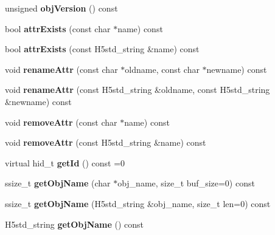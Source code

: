 \begin{DoxyCompactItemize}
\item 
\mbox{\label{class_h5_1_1_h5_object_aae0ac7d78a51f215d540f6ce5e5976a0}} 
unsigned {\bfseries obj\+Version} () const
\item 
\mbox{\label{class_h5_1_1_h5_object_a354b677eedb053dcdab090434d19e1bf}} 
bool {\bfseries attr\+Exists} (const char $\ast$name) const
\item 
\mbox{\label{class_h5_1_1_h5_object_a170d3028f081678db83132cc5434b00f}} 
bool {\bfseries attr\+Exists} (const H5std\+\_\+string \&name) const
\item 
\mbox{\label{class_h5_1_1_h5_object_a303a5fa51c03a7ed302fe88a7cd79eef}} 
void {\bfseries rename\+Attr} (const char $\ast$oldname, const char $\ast$newname) const
\item 
\mbox{\label{class_h5_1_1_h5_object_aa8e376bb5dc1c4c0e375db889b08b0e2}} 
void {\bfseries rename\+Attr} (const H5std\+\_\+string \&oldname, const H5std\+\_\+string \&newname) const
\item 
\mbox{\label{class_h5_1_1_h5_object_aad1cbcfb19f7993c981b7f2dfd8c7d2e}} 
void {\bfseries remove\+Attr} (const char $\ast$name) const
\item 
\mbox{\label{class_h5_1_1_h5_object_a17e15c351f218dc2413ee7a3e09ce877}} 
void {\bfseries remove\+Attr} (const H5std\+\_\+string \&name) const
\item 
\mbox{\label{class_h5_1_1_h5_object_a9fbbbd289647d76df6cdc74f48d39094}} 
virtual hid\+\_\+t {\bfseries get\+Id} () const =0
\item 
\mbox{\label{class_h5_1_1_h5_object_a70535cfa7cbdfff89238083b4a58ca33}} 
ssize\+\_\+t {\bfseries get\+Obj\+Name} (char $\ast$obj\+\_\+name, size\+\_\+t buf\+\_\+size=0) const
\item 
\mbox{\label{class_h5_1_1_h5_object_ad8b0a20e4c05f1cbf0123214333d8a8c}} 
ssize\+\_\+t {\bfseries get\+Obj\+Name} (H5std\+\_\+string \&obj\+\_\+name, size\+\_\+t len=0) const
\item 
\mbox{\label{class_h5_1_1_h5_object_af87e012949a2c19c58fed87c2657565a}} 
H5std\+\_\+string {\bfseries get\+Obj\+Name} () const
\end{DoxyCompactItemize}
